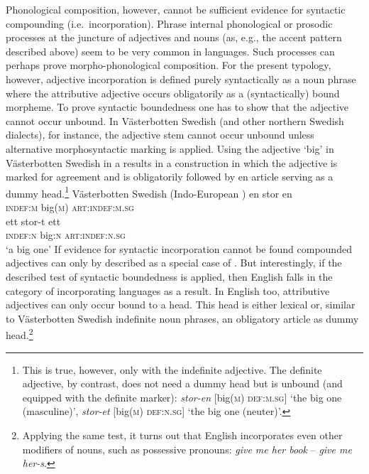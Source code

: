 Phonological composition, however, cannot be sufficient evidence for syntactic compounding (i.e.~incorporation). Phrase internal phonological or prosodic processes at the juncture of adjectives and nouns (as, e.g., the accent pattern described above) seem to be very common in languages. Such processes can perhaps prove morpho-phonological composition. For the present typology, however, adjective incorporation is defined purely syntactically as a noun phrase where the attributive adjective occurs obligatorily as a (syntactically) bound morpheme. To prove syntactic boundedness one has to show that the adjective cannot occur unbound. In Västerbotten Swedish (and other northern Swedish dialects), for instance, the adjective stem cannot occur unbound unless alternative morphosyntactic marking is applied. Using the adjective ‘big’ in Västerbotten Swedish in a  results in a construction in which the adjective is marked for agreement and is obligatorily followed by en article serving as a dummy head.\footnote{This is true, however, only with the indefinite adjective. The definite adjective, by contrast, does not need a dummy head but is unbound (and equipped with the definite marker): \textit{stor-en} [big(\textsc{m}) \textsc{def:m.sg}] ‘the big one (masculine)’, \textit{stor-et} [big(\textsc{m}) \textsc{def:n.sg}] ‘the big one (neuter)’.}
\ea 
\label{bondska headless}
\rm{Västerbotten Swedish (Indo-European \citep{larsson1929})}
\ea
\gll 	en stor en\\	
	\textsc{indef:m} big(\textsc{m}) \textsc{art:indef:m.sg}\\
\ex
\gll 	ett stor-t ett\\	
	\textsc{indef:n} big:\textsc{n} \textsc{art:indef:n.sg}\\
\glt	‘a big one’
\z
\z
If evidence for syntactic incorporation cannot be found compounded adjectives can only by described as a special case of . But interestingly, if the described test of syntactic boundedness is applied, then English falls in the category of incorporating languages as a result. In English too, attributive adjectives can only occur bound to a head. This head is either lexical or, similar to Västerbotten Swedish indefinite noun phrases, an obligatory article as dummy head.\footnote{Applying the same test, it turns out that English incorporates even other modifiers of nouns, such as possessive pronouns: \textit{give me her book} – \textit{give me her-s}.}


